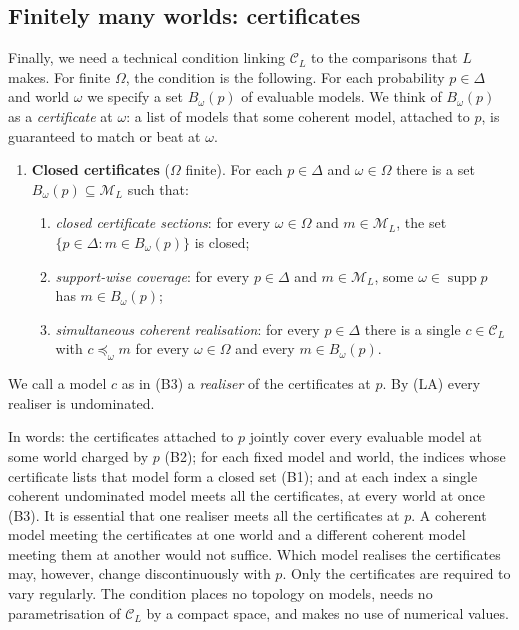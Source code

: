 \documentclass[11pt]{article}
\theoremstyle{definition}
\theoremstyle{remark}
\newcommand{\M}{\mathcal M}
\newcommand{\C}{\mathcal C}
\newcommand{\supp}{\operatorname{supp}}
\begin{document}
\subsection{Finitely many worlds: certificates}\label{sec:B}
Finally, we need a technical condition linking $\C_L$ to the comparisons that $L$ makes. For finite $\Omega$, the condition is the following. For each probability $p\in\Delta$ and world $\omega$ we specify a set $B_\omega(p)$ of evaluable models. We think of $B_\omega(p)$ as a \emph{certificate} at $\omega$: a list of models that some coherent model, attached to $p$, is guaranteed to match or beat at $\omega$.
\begin{enumerate}[label=\textbf{(B)},leftmargin=*]
\item \textbf{Closed certificates} ($\Omega$ finite). For each $p\in\Delta$ and $\omega\in\Omega$ there is a set $B_\omega(p)\subseteq\M_L$ such that:
\begin{enumerate}[label=\textbf{(B\arabic*)},leftmargin=*]
\item \emph{closed certificate sections}: for every $\omega\in\Omega$ and $m\in\M_L$, the set $\{p\in\Delta:m\in B_\omega(p)\}$ is closed;
\item \emph{support-wise coverage}: for every $p\in\Delta$ and $m\in\M_L$, some $\omega\in\supp p$ has $m\in B_\omega(p)$;
\item \emph{simultaneous coherent realisation}: for every $p\in\Delta$ there is a single $c\in\C_L$ with $c\preceq_\omega m$ for every $\omega\in\Omega$ and every $m\in B_\omega(p)$.
\end{enumerate}
\end{enumerate}
We call a model $c$ as in (B3) a \emph{realiser} of the certificates at $p$. By (LA) every realiser is undominated.

In words: the certificates attached to $p$ jointly cover every evaluable model at some world charged by $p$ (B2); for each fixed model and world, the indices whose certificate lists that model form a closed set (B1); and at each index a single coherent undominated model meets all the certificates, at every world at once (B3). It is essential that one realiser meets all the certificates at $p$. A coherent model meeting the certificates at one world and a different coherent model meeting them at another would not suffice. Which model realises the certificates may, however, change discontinuously with $p$. Only the certificates are required to vary regularly. The condition places no topology on models, needs no parametrisation of $\C_L$ by a compact space, and makes no use of numerical values.
\end{document}
